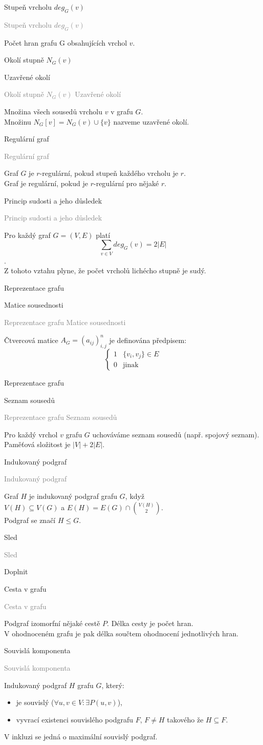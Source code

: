 \documentclass[20pt]{extarticle}
\newcommand{\card}[3][]{
	\vspace*{\fill}

	\newpage
	\topskip0pt
	\vspace*{\fill}
		\Large #2

		\vspace{1cm}
		\normalsize #1
	\vspace*{\fill}
	\newpage

	\small \textcolor{gray}{#2 #1}
	\topskip0pt
	\vspace*{\fill}

	\normalsize
	#3
	\vspace*{\fill}
}
\newcommand{\pair}[2]{\left(#1, #2\right)}
\begin{document}
\begin{center}
\card{Stupeň vrcholu $deg_G(v)$}{
  Počet hran grafu G obsahujících vrchol $v$.
}

\card[Uzavřené okolí]{Okolí stupně $N_G(v)$}{
  Množina všech sousedů vrcholu $v$ v grafu $G$.\\
  Množinu $N_G[v] = N_G(v) \cup \{v\}$ nazveme uzavřené okolí.
}

\card{Regulární graf}{
  Graf $G$ je $r$-regulární, pokud stupeň každého vrcholu je $r$.\\
  Graf je regulární, pokud je $r$-regulární pro nějaké $r$.
}

\card{Princip sudosti a jeho důsledek}{
  Pro každý graf $G = \pair{V}{E}$ platí\\
  $$\sum_{v \in V} deg_{G}(v) = 2|E|$$.\\
  Z tohoto vztahu plyne, že počet vrcholů lichécho stupně je sudý.
}

\card[Matice sousednosti]{Reprezentace grafu}{
  Čtvercová matice $A_{G} = (a_{ij})_{i,j}^n$ je definována předpisem:
  \[ \begin{cases}
        1 & \{v_{i}, v_{j}\} \in E \\
        0 & \text{jinak}
     \end{cases}
  \]
}

\card[Seznam sousedů]{Reprezentace grafu}{
  Pro každý vrchol $v$ grafu $G$ uchováváme seznam sousedů (např. spojový seznam).
  Paměťová složitost je $|V| + 2|E|$.
}

\card{Indukovaný podgraf}{
  Graf $H$ je indukovaný podgraf grafu $G$, když\\
  $V(H) \subseteq V(G)$ a $E(H) = E(G) \cap \binom{V(H)}{2}$.\\
  Podgraf se značí $H \leq G$.
}

\card{Sled}{
  Doplnit
}

\card{Cesta v grafu}{
  Podgraf izomorfní nějaké cestě $P$. Délka cesty je počet hran.\\
  V ohodnoceném grafu je pak délka součtem ohodnocení jednotlivých hran.
}

\card{Souvislá komponenta}{
  Indukovaný podgraf $H$ grafu $G$, který:
  \begin{itemize}
    \item je souvislý ($\forall u, v \in V: \exists P\pair{u}{v}$),
    \item vyvrací existenci souvislého podgrafu $F$, $F \neq H$ takového že $H \subseteq F$.
  \end{itemize}
	V inkluzi se jedná o maximální souvislý podgraf.
}


\end{center}
\end{document}
